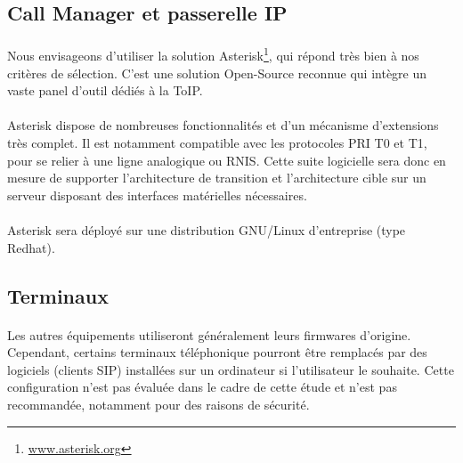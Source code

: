 \subsection{Call Manager et passerelle IP}

\paragraph{} Nous envisageons d'utiliser la solution
Asterisk\footnote{\url{www.asterisk.org}}, qui répond très bien à nos critères
de sélection. C'est une solution Open-Source reconnue qui intègre un vaste panel
d'outil dédiés à la ToIP.

\paragraph{} Asterisk dispose de nombreuses fonctionnalités et d'un mécanisme
d'extensions très complet. Il est notamment compatible avec les protocoles
\ac{PRI} T0 et T1, pour se relier à une ligne analogique ou \ac{RNIS}. Cette
suite logicielle sera donc en mesure de supporter l'architecture de transition
et l'architecture cible sur un serveur disposant des interfaces matérielles
nécessaires.

\paragraph{} Asterisk sera déployé sur une distribution GNU/Linux d'entreprise
(type Redhat).

\subsection{Terminaux}

\paragraph{} Les autres équipements utiliseront généralement leurs firmwares
d'origine. Cependant, certains terminaux téléphonique pourront être remplacés
par des logiciels (clients SIP) installées sur un ordinateur si l'utilisateur le
souhaite. Cette configuration n'est pas évaluée dans le cadre de cette étude et
n'est pas recommandée, notamment pour des raisons de sécurité.
